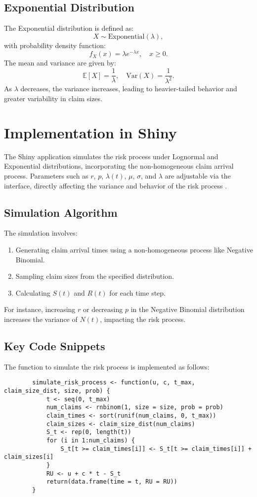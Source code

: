 \documentclass[12pt]{article}
\begin{document}
	\subsection{Exponential Distribution}
	The Exponential distribution is defined as:
	\[
	X \sim \text{Exponential}(\lambda),
	\]
	with probability density function:
	\[
	f_X(x) = \lambda e^{-\lambda x}, \quad x \geq 0.
	\]
	The mean and variance are given by:
	\[
	\mathbb{E}[X] = \frac{1}{\lambda}, \quad \text{Var}(X) = \frac{1}{\lambda^2}.
	\]
	As $\lambda$ decreases, the variance increases, leading to heavier-tailed behavior and greater variability in claim sizes.
	
	\section{Implementation in Shiny}
	The Shiny application simulates the risk process under Lognormal and Exponential distributions, incorporating the non-homogeneous claim arrival process. Parameters such as $r$, $p$, $\lambda(t)$, $\mu$, $\sigma$, and $\lambda$ are adjustable via the interface, directly affecting the variance and behavior of the risk process \cite{Embrechts.etal1997}.
	
	\subsection{Simulation Algorithm}
	The simulation involves:
	\begin{enumerate}
		\item Generating claim arrival times using a non-homogeneous process like Negative Binomial.
		\item Sampling claim sizes from the specified distribution.
		\item Calculating $S(t)$ and $R(t)$ for each time step.
	\end{enumerate}
	For instance, increasing $r$ or decreasing $p$ in the Negative Binomial distribution increases the variance of $N(t)$, impacting the risk process.
	
	\subsection{Key Code Snippets}
	The function to simulate the risk process is implemented as follows:
	\begin{verbatim}
		simulate_risk_process <- function(u, c, t_max, claim_size_dist, size, prob) {
			t <- seq(0, t_max)
			num_claims <- rnbinom(1, size = size, prob = prob)
			claim_times <- sort(runif(num_claims, 0, t_max))
			claim_sizes <- claim_size_dist(num_claims)
			S_t <- rep(0, length(t))
			for (i in 1:num_claims) {
				S_t[t >= claim_times[i]] <- S_t[t >= claim_times[i]] + claim_sizes[i]
			}
			RU <- u + c * t - S_t
			return(data.frame(time = t, RU = RU))
		}
	\end{verbatim}
	
\end{document}
